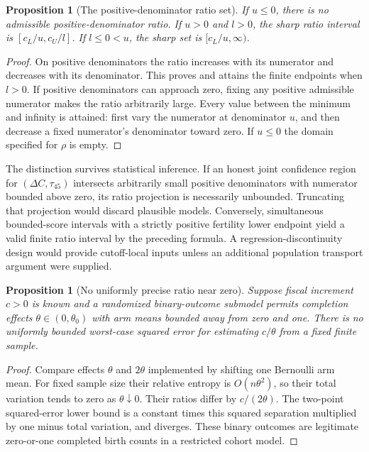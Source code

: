 \documentclass[11pt]{article}
\newtheorem{proposition}[theorem]{Proposition}
\theoremstyle{remark}
\begin{document}
\begin{proposition}[The positive-denominator ratio set]
If $u\le0$, there is no admissible positive-denominator ratio. If $u>0$ and $l>0$, the sharp ratio interval is
$[c_L/u,c_U/l]$. If $l\le0<u$, the sharp set is $[c_L/u,\infty)$.
\end{proposition}
\begin{proof}
On positive denominators the ratio increases with its numerator and decreases with its denominator. This proves and attains the finite endpoints when $l>0$. If positive denominators can approach zero, fixing any positive admissible numerator makes the ratio arbitrarily large. Every value between the minimum and infinity is attained: first vary the numerator at denominator $u$, and then decrease a fixed numerator's denominator toward zero. If $u\le0$ the domain specified for $\rho$ is empty.
\end{proof}
The distinction survives statistical inference. If an honest joint confidence region for $(\Delta C,\tau_{45})$ intersects arbitrarily small positive denominators with numerator bounded above zero, its ratio projection is necessarily unbounded. Truncating that projection would discard plausible models. Conversely, simultaneous bounded-score intervals with a strictly positive fertility lower endpoint yield a valid finite ratio interval by the preceding formula. A regression-discontinuity design would provide cutoff-local inputs unless an additional population transport argument were supplied.

\begin{proposition}[No uniformly precise ratio near zero]
Suppose fiscal increment $c>0$ is known and a randomized binary-outcome submodel permits completion effects $\theta\in(0,\theta_0)$ with arm means bounded away from zero and one. There is no uniformly bounded worst-case squared error for estimating $c/\theta$ from a fixed finite sample.
\end{proposition}
\begin{proof}
Compare effects $\theta$ and $2\theta$ implemented by shifting one Bernoulli arm mean. For fixed sample size their relative entropy is $O(n\theta^2)$, so their total variation tends to zero as $\theta\downarrow0$. Their ratios differ by $c/(2\theta)$. The two-point squared-error lower bound is a constant times this squared separation multiplied by one minus total variation, and diverges. These binary outcomes are legitimate zero-or-one completed birth counts in a restricted cohort model.
\end{proof}
\end{document}
